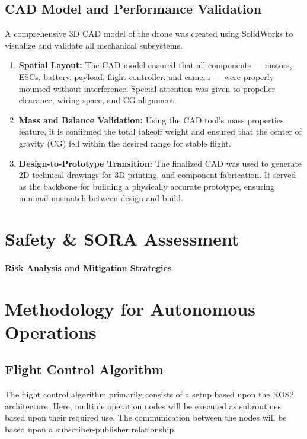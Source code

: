 \documentclass[12pt]{report}
\begin{document}
    \section{CAD Model and Performance Validation}
    A comprehensive 3D CAD model of the drone was created using SolidWorks to visualize and validate all mechanical subsystems.
    \begin{enumerate}
      \item \textbf{Spatial Layout:} The CAD model ensured that all components — motors, ESCs, battery, payload, flight controller, and camera — were properly mounted without interference. Special attention was given to propeller clearance, wiring space, and CG alignment.
      \item \textbf{Mass and Balance Validation:} Using the CAD tool’s mass properties feature, it is confirmed the total takeoff weight and ensured that the center of gravity (CG) fell within the desired range for stable flight. 
      \item \textbf{Design-to-Prototype Transition:} The finalized CAD was used to generate 2D technical drawings for 3D printing, and component fabrication. It served as the backbone for building a physically accurate prototype, ensuring minimal mismatch between design and build.
    \end{enumerate}
  \chapter{Safety \& SORA Assessment}
    \subsubsection{\Large Risk Analysis and Mitigation Strategies}
      
  \chapter{Methodology for Autonomous Operations}
    \section{Flight Control Algorithm}
    The flight control algorithm primarily consists of a setup based upon the ROS2 architecture. Here, multiple operation nodes will be executed as subroutines based upon their required use. The communication between the nodes will be based upon a subscriber-publisher relationship.\\
\end{document}
